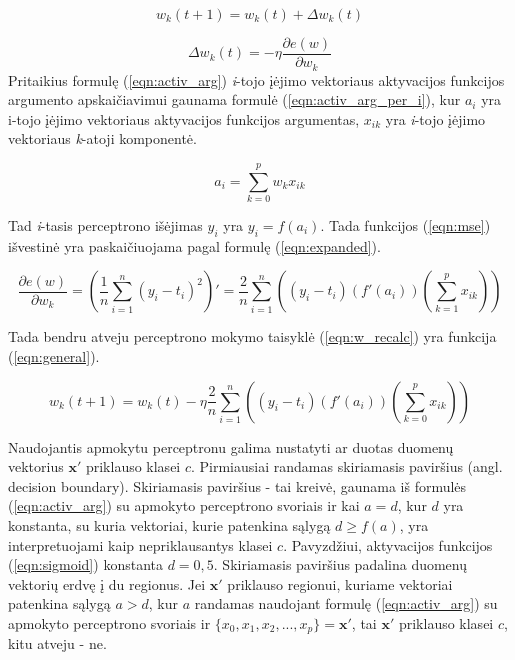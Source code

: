\begin{equation}
	\label{eqn:w_recalc}
	w_k(t + 1) = w_k(t) + \Delta w_k(t)
\end{equation}

\begin{equation}
	\label{eqn:w_change}
	\Delta w_k(t) = - \eta \dfrac{\partial e(w)}{\partial w_k}
\end{equation}
Pritaikius formulę (\ref{eqn:activ_arg}) \textit{i}-tojo įėjimo vektoriaus aktyvacijos funkcijos argumento apskaičiavimui gaunama formulė (\ref{eqn:activ_arg_per_i}), kur $a_i$ yra i-tojo įėjimo vektoriaus aktyvacijos funkcijos argumentas, $x_{ik}$ yra \textit{i}-tojo įėjimo vektoriaus \textit{k}-atoji komponentė.

\begin{equation}
	\label{eqn:activ_arg_per_i}
	a_i = \sum_{k = 0}^{p} w_{k}x_{ik}
\end{equation}

Tad \textit{i}-tasis perceptrono išėjimas $y_i$ yra $y_i = f(a_i)$. Tada funkcijos (\ref{eqn:mse}) išvestinė yra paskaičiuojama pagal formulę (\ref{eqn:expanded}).

\begin{equation}
	\label{eqn:expanded}
	\dfrac{\partial e(w)}{\partial w_k} = (\dfrac{1}{n}\sum_{i=1}^{n} (y_i - t_i)^2)'
		= \dfrac{2}{n}\sum_{i=1}^{n}
			((y_i - t_i)(f'(a_i))(\sum_{k = 1}^{p} x_{ik}))
\end{equation}

Tada bendru atveju perceptrono mokymo taisyklė (\ref{eqn:w_recalc}) yra funkcija (\ref{eqn:general}).

\begin{equation}
	\label{eqn:general}
	w_k(t + 1) = w_k(t) - \eta \dfrac{2}{n}\sum_{i=1}^{n} ((y_i - t_i)(f'(a_i))(\sum_{k = 0}^{p} x_{ik}))
\end{equation}

Naudojantis apmokytu perceptronu galima nustatyti ar duotas duomenų vektorius $\boldsymbol{x}'$ priklauso klasei $c$. Pirmiausiai randamas skiriamasis paviršius (angl. decision boundary). Skiriamasis paviršius - tai kreivė, gaunama iš formulės (\ref{eqn:activ_arg}) su apmokyto perceptrono svoriais ir kai $a = d$, kur $d$ yra konstanta, su kuria vektoriai, kurie patenkina sąlygą $d \ge f(a)$, yra interpretuojami kaip nepriklausantys klasei $c$. Pavyzdžiui, aktyvacijos funkcijos (\ref{eqn:sigmoid}) konstanta $d = 0,5$. Skiriamasis paviršius padalina duomenų vektorių erdvę į du regionus. Jei $\boldsymbol{x}'$ priklauso regionui, kuriame vektoriai patenkina sąlygą $a > d$, kur $a$ randamas naudojant formulę (\ref{eqn:activ_arg}) su apmokyto perceptrono svoriais ir $\{x_{0}, x_{1}, x_{2}, ..., x_{p}\} = \boldsymbol{x}'$, tai $\boldsymbol{x}'$ priklauso klasei $c$, kitu atveju - ne.